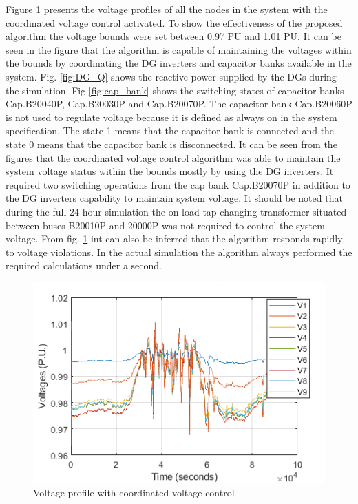 Figure \ref{fig:with_cvc} presents the voltage profiles of all the nodes in the system with the coordinated voltage control activated. To show the effectiveness of the proposed algorithm the voltage bounds were set between 0.97 PU and 1.01 PU. It can be seen in the figure that the algorithm is capable of maintaining the voltages within the bounds by coordinating the DG inverters and capacitor banks available in the system. Fig. \ref{fig:DG_Q} shows the reactive power supplied by the DGs during the simulation. Fig \ref{fig:cap_bank} shows the switching states of capacitor banks Cap.B20040P, Cap.B20030P and Cap.B20070P. The capacitor bank Cap.B20060P is not used to regulate voltage because it is defined as always on in the system specification. The state 1 means that the capacitor bank is connected and the state 0 means that the capacitor bank is disconnected. It can be seen from the figures that the coordinated voltage control algorithm was able to maintain the system voltage status within the bounds mostly by using the DG inverters. It required two switching operations from the cap bank Cap.B20070P in addition to the DG inverters capability to maintain system voltage. It should be noted that during the full 24 hour simulation the on load tap changing transformer situated between buses B20010P and 20000P was not required to control the system voltage. From fig. \ref{fig:with_cvc} int can also be inferred that the algorithm responds rapidly to voltage violations. In the actual simulation the algorithm always performed the required calculations under a second.

\begin{figure}[!h]
\centering
\includegraphics[width=\linewidth]{figs/With_VVC.png}
\caption{Voltage profile with coordinated voltage control}
\label{fig:with_cvc}
\end{figure}

